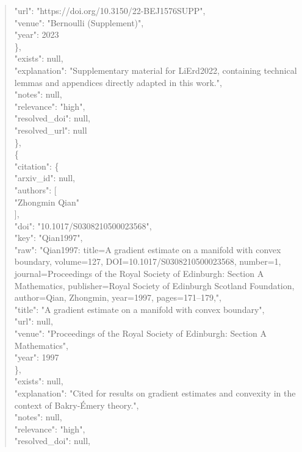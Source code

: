 \documentclass[11pt]{article}
\begin{document}
\begin{quote}
        "url": "https://doi.org/10.3150/22-BEJ1576SUPP",\\
        "venue": "Bernoulli (Supplement)",\\
        "year": 2023\\
      \},\\
      "exists": null,\\
      "explanation": "Supplementary material for LiErd2022, containing technical lemmas and appendices directly adapted in this work.",\\
      "notes": null,\\
      "relevance": "high",\\
      "resolved\_doi": null,\\
      "resolved\_url": null\\
    \},\\
    \{\\
      "citation": \{\\
        "arxiv\_id": null,\\
        "authors": [\\
          "Zhongmin Qian"\\
        ],\\
        "doi": "10.1017/S0308210500023568",\\
        "key": "Qian1997",\\
        "raw": "Qian1997: title=A gradient estimate on a manifold with convex boundary, volume=127, DOI=10.1017/S0308210500023568, number=1, journal=Proceedings of the Royal Society of Edinburgh: Section A Mathematics, publisher=Royal Society of Edinburgh Scotland Foundation, author=Qian, Zhongmin, year=1997, pages=171--179,",\\
        "title": "A gradient estimate on a manifold with convex boundary",\\
        "url": null,\\
        "venue": "Proceedings of the Royal Society of Edinburgh: Section A Mathematics",\\
        "year": 1997\\
      \},\\
      "exists": null,\\
      "explanation": "Cited for results on gradient estimates and convexity in the context of Bakry-Émery theory.",\\
      "notes": null,\\
      "relevance": "high",\\
      "resolved\_doi": null,\\

\end{quote}
\end{document}

